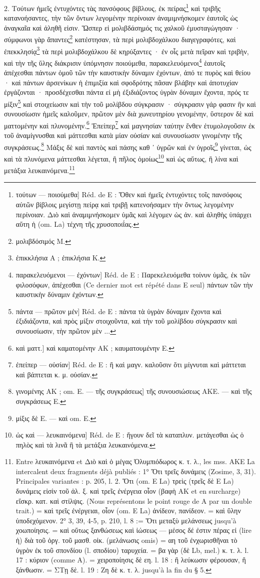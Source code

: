 \documentclass[a4paper, 11pt, oneside, polutonikogreek, french]{article}
\begin{document}
2. Τούτων ἡμεῖς ἐντυχόντες τὰς πανσόφους βίβλους, ἐκ πείρας\footnote{τούτων --- ποιούμεθα] Réd. de E : Ὅθεν καὶ ἡμεῖς ἐντυχόντες τοῖς πανσόφοις αὐτῶν βίβλοις μεγίστῃ πείρᾳ καὶ τριβῇ κατενοήσαμεν τὴν ὄντως λεγομένην περίνοιαν. Διὸ καὶ ἀναμιμνήσκομεν ὑμᾶς καὶ λέγομεν ὡς ἀν. καὶ ἀληθὴς ὑπάρχει αὕτη ἡ (om. La) τέχνη τῆς χρυσοποιΐας.} καὶ τριβῆς κατανοήσαντες, τὴν τῶν ὄντων λεγομένην περίνοιαν ἀναμιμνήσκομεν ἑαυτοῖς ὡς ἀναγκαῖα καὶ ἀληθῆ εἰσιν. Ὥσπερ εἰ μολιβδάσημός τις χαλκοῦ ἐμυσταγώγησαν · σύμφωνοι γὰρ ἅπαντες\footnote{μολιβδόσιμός M.} κατέστησαν, τὰ περὶ μολιβδοχάλκου διαγεγραφότες, καὶ ἐπεκκλησίᾳ\footnote{ἐπικκλήσια A ; ἐπικλήσια K.} τὰ περὶ μολιβδοχάλκου δὲ κηρύξαντες · ἐν οἷς μετὰ πεῖραν καὶ τριβὴν, καὶ τὴν τῆς ὕλης διάκρισιν ὑπόμνησιν ποιούμεθα, παρακελευόμενοι\footnote{παρακελευόμενοι --- ἐχόντων] Réd. de E : Παρεκελευόμεθα τοίνυν ὑμᾶς, ἐκ τῶν φιλοσόφων, ἀπέχεσθαι (Ce dernier mot est répété dans E seul) πάντων τῶν τὴν καυστικὴν δύναμιν ἐχόντων.} ἑαυτοῖς ἀπέχεσθαι πάντων ὁμοῦ τῶν τὴν καυστικὴν δύναμιν ἐχόντων, ἀπό τε πυρὸς καὶ θείου · καὶ πάντων ἀρσενίκων ἡ ἐπιμιξία καὶ σφοδρότης πᾶσαν βλάβην καὶ ἀποτυχίαν ἐργάζονται · προσδέχεσθαι πάντα εἰ μὴ ἐξιδιάζοντος ὑγρὰν δύναμιν ἔχοντα, πρός τε μίξιν\footnote{πάντα --- πρῶτον μἐν] Réd. de E : πάντα τὰ ὑγρὰν δύναμιν ἔχοντα καὶ ἐξιδιάζοντα, καὶ πρὸς μίξιν στοιχοῦντα, καὶ τὴν τοῦ μολίβδου σύγκρασιν καὶ συνουσίωσιν, τὴν πρῶτον μὲν ...} καὶ στοιχείωσιν καὶ τὴν τοῦ μολίβδου σύγκρασιν · σύγκρασιν γάρ φασιν ἣν καὶ συνουσίωσιν ἡμεῖς καλοῦμεν, πρῶτον μὲν διὰ χωνευτηρίου γενομένην, ὕστερον δὲ καὶ ματτομένην καὶ πλυνομένην.\footnote{καὶ ματτ.] καὶ καματομένην AΚ ; καυματουμένην E.} Ἐπείπερ\footnote{ἐπείπερ --- οὐσίαν] Réd. de E : ἢ καὶ μαγν. καλοῦσιν ὅτι μίγνυται καὶ μάττεται καὶ βάπτεται κ. μ. οὐσίαν.} καὶ μαγνησίαν ταύτην ἔνθεν ἐτυμολογοῦσιν ἐκ τοῦ ἀναμίγνυσθαι καὶ μάττεσθαι κατὰ μίαν οὐσίαν καὶ συνουσίωσιν γινομένην τῆς συγκράσεως.\footnote{γινομένης AK ; om. E. --- τῆς συγκράσεως] τῆς συνουσιώσεως AKE. --- καὶ τῆς συγκράσεως E.} Μάξις δὲ καὶ παντὸς καὶ πάσης καθ ᾽ ὑγρῶν καὶ ἐν ὑγροῖς\footnote{μίξις δὲ E. --- καὶ om. E.} γίνεται, ὡς καὶ τὰ πλυνόμενα μάττεσθαι λέγεται, ἢ πῆλος ὁμοίως\footnote{ὡς καὶ --- λευκαινόμενα] Réd. de E : ἤγουν δεῖ τὰ καταπλυν. μετάγεσθαι ὡς ὁ πηλὸς καὶ τὰ λινᾶ ἢ τὰ μετάξια λευκαινόμενα.} καὶ ὡς αὕτως, ἢ λίνα καὶ μετάξια λευκαινόμενα.\footnote{Entre λευκαινόμενα et Διὸ καὶ ὁ μέγας Ὀλυμπιόδωρος κ. τ. λ., les mss. AKE La intercalent deux fragments déjà publiés : 1° Ὅτι τρεῖς δυνάμεις (Zosime, 3, 31). Principales variantes : p. 205, l. 2. Ὅτι (om. E La) τρεὶς (τρεῖς δὲ E La) δυνάμεις εἰσὶν τοῦ ἀλ. ξ. καὶ τρεῖς ἐνέργεια οἷον (βαφὴ AK et en surcharge) εἴσκρ. κατ. καὶ στίλψις. (Nous représentons le point rouge de A par un double trait.) = καὶ τρεῖς ἐνέργειαι, οἷον (om. E La) ἀνίδεον, πανίδεον. = καὶ ὕλην ὑποδεχόμενον. 2° 3, 39, 4-5, p. 210, l. 8 := Ὅτι μεταξὺ μελάνσεως jusqu'à χοωποίησις. = καὶ οὕτως ξανθώσεως καὶ ἰώσεως --- μέσος δέ ἐστιν πέρας εἰ (lire ἡ) διὰ τοῦ ὀργ. τοῦ μασθ. οἰκ. (μελάνωσις omis) = αη τοῦ ἐνχωρισθῆναι τὸ ὑγρὸν ἐκ τοῦ σπονδίου (l. σποδίου) ταρυχεία. = βα γὰρ (δὲ Lb, mel.) κ. τ. λ. l. 17 : κύριον (comme A). = χειροποίησις δὲ εη. l. 18 : ἢ λεύκωσιν φέρουσαν, ἢ ξάνθωσιν. = ΣΤῃ δὲ. l. 19 : Ζη δὲ κ. τ. λ. jusqu'à la fin du § 5.}
\end{document}
